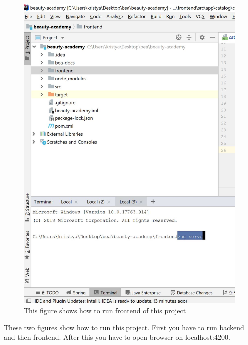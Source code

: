 \documentclass{scrartcl}
\begin{document}
\begin{figure}[H]
\centering
\includegraphics[width=150mm]{run_frontend.JPG}
\caption{This figure shows how to run frontend of this project}
\label{blabla}
\end{figure}

These two figures show how to run this project. First you have to run backend and then frontend. After this you have to open browser on localhost:4200.
\end{document}
